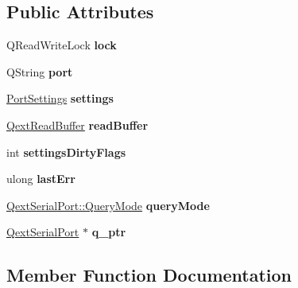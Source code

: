 \subsection*{Public Attributes}
\begin{DoxyCompactItemize}
\item 
\mbox{\label{classQextSerialPortPrivate_a5b461024ffc2ced2aab35f9ea2479678}} 
Q\+Read\+Write\+Lock {\bfseries lock}
\item 
\mbox{\label{classQextSerialPortPrivate_ad71bd4158f2a126e9bc4d81945e44f49}} 
Q\+String {\bfseries port}
\item 
\mbox{\label{classQextSerialPortPrivate_a3e5003cc8b0fe0d8ac2384473073b112}} 
\hyperlink{structPortSettings}{Port\+Settings} {\bfseries settings}
\item 
\mbox{\label{classQextSerialPortPrivate_a70b82e3f7cd919b5f6cece84d97f8c69}} 
\hyperlink{classQextReadBuffer}{Qext\+Read\+Buffer} {\bfseries read\+Buffer}
\item 
\mbox{\label{classQextSerialPortPrivate_a34e162f9f23ec8628ba91b96c3195c08}} 
int {\bfseries settings\+Dirty\+Flags}
\item 
\mbox{\label{classQextSerialPortPrivate_a20d35bc9b81de6f67bc935cb1095dab9}} 
ulong {\bfseries last\+Err}
\item 
\mbox{\label{classQextSerialPortPrivate_a96c0bd1305fc54c331692b4cb9af1724}} 
\hyperlink{classQextSerialPort_a6002128d7351ea9a958d6a6d1fc6b9bd}{Qext\+Serial\+Port\+::\+Query\+Mode} {\bfseries query\+Mode}
\item 
\mbox{\label{classQextSerialPortPrivate_ac1a6c45f7c3621d5f926d5250cdac194}} 
\hyperlink{classQextSerialPort}{Qext\+Serial\+Port} $\ast$ {\bfseries q\+\_\+ptr}
\end{DoxyCompactItemize}


\subsection{Member Function Documentation}
\mbox{\label{classQextSerialPortPrivate_a43f36344c4f79f1851860118975495f6}} 
